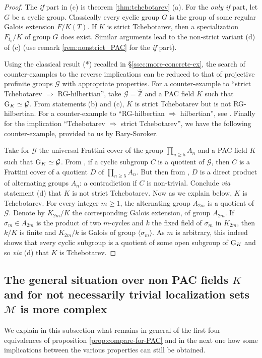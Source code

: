 \documentclass[12pt,english]{amsart}
\newtheorem{twisting lemma}[theorem]{Twisting lemma}
\begin{document}
\begin{proof}
The {\it if} part in (c) is theorem \ref{thm:tchebotarev} (a).
For the {\it only if} part, let $G$ be a cyclic group. Classically every cyclic group $G$ is the group of some regular Galois extension $F/K(T)$.
If $K$ is strict Tchebotarev, then a specialization $F_{t_0}/K$ of group $G$ does exist. Similar arguments lead to the non-strict variant (d) of (c) (use remark \ref{rem:nonstrict_PAC} for the {\it if} part).

Using the classical result (*) recalled in \S \ref{ssec:more-concrete-ex}, the search of counter-examples to the reverse implications can be reduced to that of projective profinite groups ${\mathcal G}$ with appropriate properties. For a counter-example to ``strict Tchebotarev $\Rightarrow$ RG-hilbertian'', take ${\mathcal G} = \widehat {\mathbb{Z}}$ and a PAC field $K$ such that ${\hbox{\rm G}}_K \simeq {\mathcal G}$. From statements (b) and (c), $K$ is strict Tchebotarev but is not RG-hilbertian.
For a counter-example to ``RG-hilbertian $\Rightarrow$ hilbertian'', see \cite[\S 2]{FV92}. Finally for the implication  ``Tchebotarev $\Rightarrow$ strict Tchebotarev'', we have the following counter-example, provided to us by Bary-Soroker.

Take for ${\mathcal G}$ the universal Frattini cover \cite[\S 22.6]{FrJa} of the group $\prod_{n\geq 5} A_n$ and a PAC field $K$ such that ${\hbox{\rm G}}_K \simeq {\mathcal G}$. From \cite[lemma 22.6.3]{FrJa}, if a cyclic subgroup $C$ is a quotient of ${\mathcal G}$, then $C$ is a Frattini cover of a quotient $D$ of $\prod_{n\geq 5} A_n$. But then from \cite[lemma 25.5.3]{FrJa}, $D$ is a direct product of alternating groups $A_n$: a contradiction if $C$ is non-trivial. Conclude {\it via} statement (d) that $K$ is not strict Tchebotarev. Now as we explain below, $K$ is Tchebotarev. For every integer $m\geq 1$, the alternating group 
$A_{2m}$ is a quotient of ${\mathcal G}$. Denote by $K_{2m}/K$ the corresponding Galois extension, 
of group $A_{2m}$. If $\sigma_m\in A_{2m}$ is the product of two $m$-cycles and $k$ the fixed field of $\sigma_m$ in $K_{2m}$, then $k/K$ is finite and  $K_{2m}/k$ is Galois of group $\langle \sigma_m \rangle$. As $m$ is arbitrary, this indeed shows that every cyclic subgroup is a quotient of some 
open subgroup of ${\hbox{\rm G}}_K$ and so {\it via} (d) that $K$ is Tchebotarev.
\end{proof}

\subsection{The general situation {\rm over non PAC fields $K$ and for not necessarily trivial localization sets $\mathcal M$ is more complex} } \label{ssec:general-situation}    We explain in this subsection what remains in general of 
the first four equivalences of proposition \ref {prop:compare-for-PAC} and in the next one how 
some implications between the various properties can still be obtained.
\vskip 0mm
\end{document}
